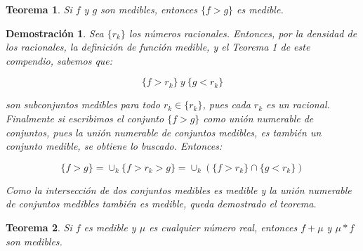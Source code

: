 \documentclass{article}
\newtheorem{theorem}{Teorema}
\newtheorem{demostration}{Demostración}
\begin{document}
\begin{theorem}
Si $f$ y $g$ son medibles, entonces $\{f > g\}$ es medible.
\end{theorem}

\begin{demostration}
Sea $\{r_k\}$ los números racionales. Entonces, por la densidad de los racionales, la definición de función medible, y el Teorema 1 de este compendio, sabemos que:

\begin{equation}
\{f > r_k\} \> y \> \{g < r_k\}
\end{equation}

son subconjuntos medibles para todo $r_k \in \{r_k\}$, pues cada $r_k$ es un racional. Finalmente si escribimos el conjunto $\{f > g\}$ como unión numerable de conjuntos, pues la unión numerable de conjuntos medibles, es también un conjunto medible, se obtiene lo buscado. Entonces:

\begin{equation}
\{f > g\} = \cup_k \{f > r_k > g\} = \cup_k (\{f > r_k\} \cap \{g < r_k\})
\end{equation}

Como la intersección de dos conjuntos medibles es medible y la unión numerable de conjuntos medibles también es medible, queda demostrado el teorema.
\end{demostration}

\begin{theorem}
Si $f$ es medible y $\mu$ es cualquier número real, entonces $f + \mu$ y $\mu*f$ son medibles.
\end{theorem}
\end{document}
